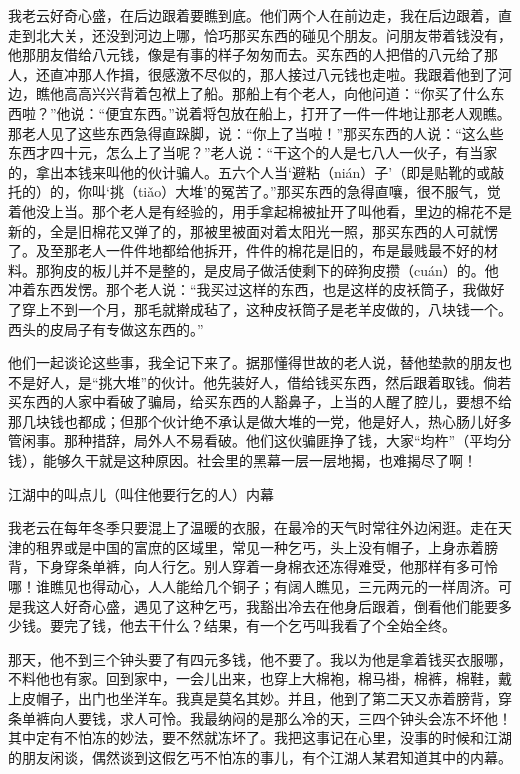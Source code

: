 \documentclass[12pt,UTF8]{ctexbook}
\begin{document}
我老云好奇心盛，在后边跟着要瞧到底。他们两个人在前边走，我在后边跟着，直走到北大关，还没到河边上哪，恰巧那买东西的碰见个朋友。问朋友带着钱没有，他那朋友借给八元钱，像是有事的样子匆匆而去。买东西的人把借的八元给了那人，还直冲那人作揖，很感激不尽似的，那人接过八元钱也走啦。我跟着他到了河边，瞧他高高兴兴背着包袱上了船。那船上有个老人，向他问道：“你买了什么东西啦？”他说：“便宜东西。”说着将包放在船上，打开了一件一件地让那老人观瞧。那老人见了这些东西急得直跺脚，说：“你上了当啦！”那买东西的人说：“这么些东西才四十元，怎么上了当呢？”老人说：“干这个的人是七八人一伙子，有当家的，拿出本钱来叫他的伙计骗人。五六个人当‘避粘（nián）子’（即是贴靴的或敲托的）的，你叫‘挑（tiǎo）大堆’的冤苦了。”那买东西的急得直嚷，很不服气，觉着他没上当。那个老人是有经验的，用手拿起棉被扯开了叫他看，里边的棉花不是新的，全是旧棉花又弹了的，那被里被面对着太阳光一照，那买东西的人可就愣了。及至那老人一件件地都给他拆开，件件的棉花是旧的，布是最贱最不好的材料。那狗皮的板儿并不是整的，是皮局子做活使剩下的碎狗皮攒（cuán）的。他冲着东西发愣。那个老人说：“我买过这样的东西，也是这样的皮袄筒子，我做好了穿上不到一个月，那毛就擀成毡了，这种皮袄筒子是老羊皮做的，八块钱一个。西头的皮局子有专做这东西的。”

他们一起谈论这些事，我全记下来了。据那懂得世故的老人说，替他垫款的朋友也不是好人，是“挑大堆”的伙计。他先装好人，借给钱买东西，然后跟着取钱。倘若买东西的人家中看破了骗局，给买东西的人豁鼻子，上当的人醒了腔儿，要想不给那几块钱也都成；但那个伙计绝不承认是做大堆的一党，他是好人，热心肠儿好多管闲事。那种措辞，局外人不易看破。他们这伙骗匪挣了钱，大家“均杵”（平均分钱），能够久干就是这种原因。社会里的黑幕一层一层地揭，也难揭尽了啊！





江湖中的叫点儿（叫住他要行乞的人）内幕


我老云在每年冬季只要混上了温暖的衣服，在最冷的天气时常往外边闲逛。走在天津的租界或是中国的富庶的区域里，常见一种乞丐，头上没有帽子，上身赤着膀背，下身穿条单裤，向人行乞。别人穿着一身棉衣还冻得难受，他那样有多可怜哪！谁瞧见也得动心，人人能给几个铜子；有阔人瞧见，三元两元的一样周济。可是我这人好奇心盛，遇见了这种乞丐，我豁出冷去在他身后跟着，倒看他们能要多少钱。要完了钱，他去干什么？结果，有一个乞丐叫我看了个全始全终。

那天，他不到三个钟头要了有四元多钱，他不要了。我以为他是拿着钱买衣服哪，不料他也有家。回到家中，一会儿出来，也穿上大棉袍，棉马褂，棉裤，棉鞋，戴上皮帽子，出门也坐洋车。我真是莫名其妙。并且，他到了第二天又赤着膀背，穿条单裤向人要钱，求人可怜。我最纳闷的是那么冷的天，三四个钟头会冻不坏他！其中定有不怕冻的妙法，要不然就冻坏了。我把这事记在心里，没事的时候和江湖的朋友闲谈，偶然谈到这假乞丐不怕冻的事儿，有个江湖人某君知道其中的内幕。
\end{document}
